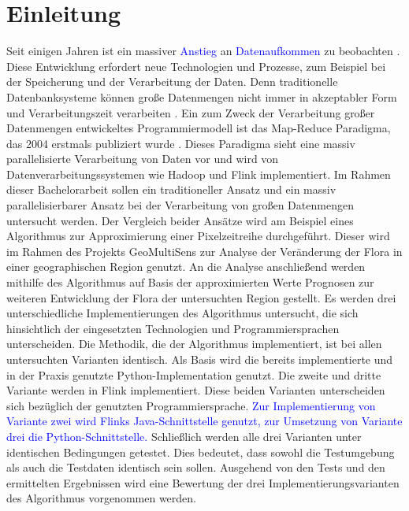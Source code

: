 \chapter{Einleitung}
Seit einigen Jahren ist ein massiver \textcolor{blue}{Anstieg} an \textcolor{blue}{Datenaufkommen} zu beobachten \cite{EMC2014}. Diese Entwicklung erfordert neue Technologien und Prozesse, zum Beispiel bei der Speicherung und der Verarbeitung der Daten. Denn traditionelle Datenbanksysteme können große Datenmengen nicht immer in akzeptabler Form und Verarbeitungszeit verarbeiten \cite{Jacobs2009}. Ein zum Zweck der Verarbeitung großer Datenmengen entwickeltes Programmiermodell ist das Map-Reduce Paradigma, das 2004 erstmals publiziert wurde \cite{Dean2008}. Dieses Paradigma sieht eine massiv parallelisierte Verarbeitung von Daten vor und wird von Datenverarbeitungssystemen wie Hadoop \cite{HadoopWebsite} und Flink \cite{FlinkWebsite} implementiert.
\newline
Im Rahmen dieser Bachelorarbeit sollen ein traditioneller Ansatz und ein massiv parallelisierbarer Ansatz bei der Verarbeitung von großen Datenmengen untersucht werden. Der Vergleich beider Ansätze wird am Beispiel eines Algorithmus zur Approximierung einer Pixelzeitreihe durchgeführt. Dieser wird im Rahmen des Projekts GeoMultiSens \cite{GeoMultiSensWebsite}
 zur Analyse der Veränderung der Flora in einer geographischen Region genutzt. An die Analyse anschließend werden mithilfe des Algorithmus auf Basis der approximierten Werte Prognosen zur weiteren Entwicklung der Flora der untersuchten Region gestellt.
\newline
Es werden drei unterschiedliche Implementierungen des Algorithmus untersucht, die sich hinsichtlich der eingesetzten Technologien und Programmiersprachen unterscheiden. Die Methodik, die der Algorithmus implementiert, ist bei allen untersuchten Varianten identisch. Als Basis wird die bereits implementierte und in der Praxis genutzte Python-Implementation genutzt. Die zweite und dritte Variante werden in Flink implementiert. Diese beiden Varianten unterscheiden sich bezüglich der genutzten Programmiersprache. \textcolor{blue}{Zur Implementierung von Variante zwei wird Flinks Java-Schnittstelle genutzt, zur Umsetzung von Variante drei die Python-Schnittstelle.} Schließlich werden alle drei Varianten unter identischen Bedingungen getestet. Dies bedeutet, dass sowohl die Testumgebung als auch die Testdaten identisch sein sollen. Ausgehend von den Tests und den ermittelten Ergebnissen wird eine Bewertung der drei Implementierungsvarianten des Algorithmus vorgenommen werden.

